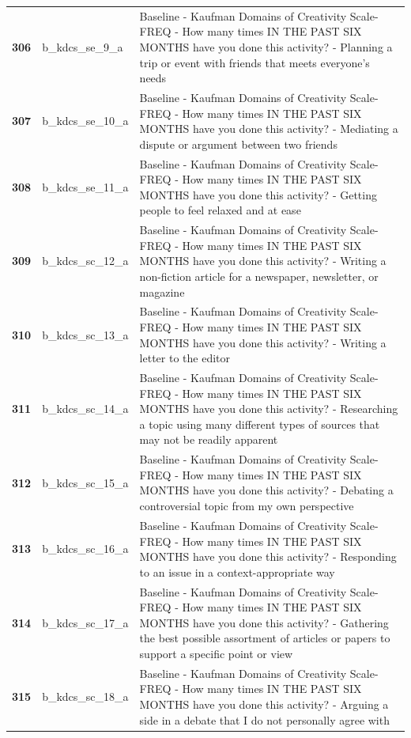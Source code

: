 \documentclass[
  letterpaper,
  DIV=11,
  numbers=noendperiod]{scrartcl}
\begin{document}
\begin{longtable}[t]{>{}cll}
\addlinespace
\textbf{306} & b\_kdcs\_se\_9\_a & Baseline - Kaufman Domains of Creativity Scale-FREQ - How many times IN THE PAST SIX MONTHS have you done this activity? - Planning a trip or event with friends that meets everyone's needs\\
\textbf{307} & b\_kdcs\_se\_10\_a & Baseline - Kaufman Domains of Creativity Scale-FREQ - How many times IN THE PAST SIX MONTHS have you done this activity? - Mediating a dispute or argument between two friends\\
\textbf{308} & b\_kdcs\_se\_11\_a & Baseline - Kaufman Domains of Creativity Scale-FREQ - How many times IN THE PAST SIX MONTHS have you done this activity? - Getting people to feel relaxed and at ease\\
\textbf{309} & b\_kdcs\_sc\_12\_a & Baseline - Kaufman Domains of Creativity Scale-FREQ - How many times IN THE PAST SIX MONTHS have you done this activity? - Writing a non-fiction article for a newspaper, newsletter, or magazine\\
\textbf{310} & b\_kdcs\_sc\_13\_a & Baseline - Kaufman Domains of Creativity Scale-FREQ - How many times IN THE PAST SIX MONTHS have you done this activity? - Writing a letter to the editor\\
\addlinespace
\textbf{311} & b\_kdcs\_sc\_14\_a & Baseline - Kaufman Domains of Creativity Scale-FREQ - How many times IN THE PAST SIX MONTHS have you done this activity? - Researching a topic using many different types of sources that may not be readily apparent\\
\textbf{312} & b\_kdcs\_sc\_15\_a & Baseline - Kaufman Domains of Creativity Scale-FREQ - How many times IN THE PAST SIX MONTHS have you done this activity? - Debating a controversial topic from my own perspective\\
\textbf{313} & b\_kdcs\_sc\_16\_a & Baseline - Kaufman Domains of Creativity Scale-FREQ - How many times IN THE PAST SIX MONTHS have you done this activity? - Responding to an issue in a context-appropriate way\\
\textbf{314} & b\_kdcs\_sc\_17\_a & Baseline - Kaufman Domains of Creativity Scale-FREQ - How many times IN THE PAST SIX MONTHS have you done this activity? - Gathering the best possible assortment of articles or papers to support a specific point or view\\
\textbf{315} & b\_kdcs\_sc\_18\_a & Baseline - Kaufman Domains of Creativity Scale-FREQ - How many times IN THE PAST SIX MONTHS have you done this activity? - Arguing a side in a debate that I do not personally agree with\\

\end{longtable}
\end{document}
